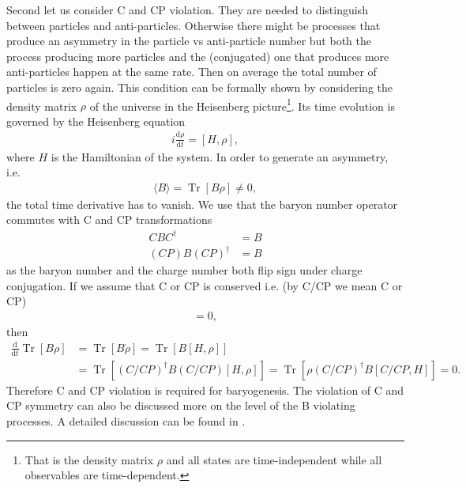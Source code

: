 \documentclass[13pt,a4paper,titlepage]{article}
\newcommand{\Tr}{\operatorname{Tr}}
\begin{document}
\noindent
Second let us consider C and CP violation. They are needed to distinguish between particles and anti-particles. Otherwise there might be processes that produce an asymmetry in the
particle vs anti-particle number but both the process producing more particles and the (conjugated) one that produces more anti-particles happen at the same rate.
Then on average the total number of particles is zero again.
This condition can be formally shown by considering the density matrix $\rho$ of the universe in the Heisenberg picture\footnote{That is the density matrix $\rho$ and all states are time-independent while all observables are time-dependent.}. Its time evolution is governed by the Heisenberg equation
\begin{align}
    i \frac{\mathrm{d} \rho}{\mathrm{d} t} = [H, \rho],
\end{align}
where $H$ is the Hamiltonian of the system.
In order to generate an asymmetry, i.e.
\begin{align}
    \langle B \rangle = \Tr [ B \rho ] \neq 0,
\end{align}
the total time derivative has to vanish.
We use that the baryon number operator commutes with C and CP transformations
\begin{align}
    C B C^\dagger &= B \\
    (C P) B (C P)^\dagger &= B
\end{align}
as the baryon number and the charge number both flip sign under charge conjugation.
If we assume that C or CP is conserved i.e. (by C/CP we mean C or CP)
\begin{align}
[H, C/CP] = 0,
\end{align}
then
\begin{align}
    \frac{\mathrm{d}}{\mathrm{d} t} \Tr [ B \rho ] &= \Tr [ B \dot{\rho} ] = \Tr [ B [H, \rho] ] \\
    &= \Tr [ (C/CP)^\dagger B (C/CP) [H, \rho] ] = \Tr [ \rho (C/CP)^\dagger B [C/CP, H] ] = 0.
\end{align}
Therefore C and CP violation is required for baryogenesis. The violation of C and CP symmetry can also be discussed more on the level of the B violating processes. A detailed discussion can be found in \cite[sec 2.3]{Cline:2006ts_Baryogenesis}. %
\end{document}
